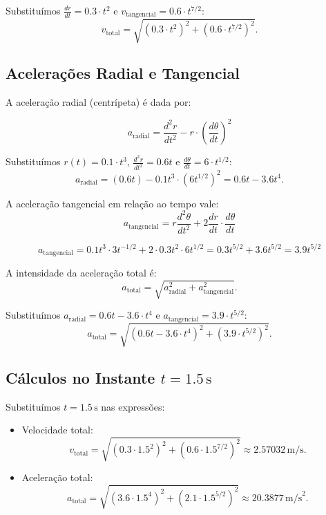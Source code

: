 Substituímos \(\frac{dr}{dt} = 0.3 \cdot t^2\) e \(v_{\text{tangencial}} = 0.6 \cdot t^{7/2}\):
\[
v_{\text{total}} = \sqrt{\left(0.3 \cdot t^2\right)^2 + \left(0.6 \cdot t^{7/2}\right)^2}.
\]

\subsection*{Acelerações Radial e Tangencial}
A aceleração radial (centrípeta) é dada por:

\[
a_{\text{radial}} = \frac{d^2r}{dt^2} - r\cdot \left(\frac{d\theta}{dt}\right)^2
\]


Substituímos \(r(t) = 0.1 \cdot t^3\), \(\frac{d^2r}{dt^2} = 0.6t\) e \(\frac{d\theta}{dt} = 6 \cdot t^{1/2}\):
\[
a_{\text{radial}} = \left(0.6t\right) - 0.1t^3 \cdot (6 t^{1/2})^2 = 0.6t - 3.6t^4.
\]


A aceleração tangencial em relação ao tempo vale:
\[
a_{\text{tangencial}} = r \frac{d^2\theta}{dt^2} + 2\frac{dr}{dt}\cdot \frac{d\theta}{dt}
\]

\[
a_{\text{tangencial}} = 0.1t^3 \cdot 3t^{-1/2} + 2\cdot 0.3t^2\cdot 6t^{1/2} = 0.3t^{5/2} + 3.6 t^{5/2} = 3.9 t^{5/2}
\]

A intensidade da aceleração total é:
\[
a_{\text{total}} = \sqrt{a_{\text{radial}}^2 + a_{\text{tangencial}}^2}.
\]

Substituímos \(a_{\text{radial}} = 0.6t - 3.6 \cdot t^4\) e \(a_{\text{tangencial}} = 3.9 \cdot t^{5/2}\):
\[
a_{\text{total}} = \sqrt{\left(0.6t - 3.6 \cdot t^4\right)^2 + \left(3.9 \cdot t^{5/2}\right)^2}.
\]

\subsection*{Cálculos no Instante \(t = 1.5 \, \text{s}\)}
Substituímos \(t = 1.5 \, \text{s}\) nas expressões:
\begin{itemize}
    \item Velocidade total:
    \[
    v_{\text{total}} = \sqrt{\left(0.3 \cdot 1.5^2\right)^2 + \left(0.6 \cdot 1.5^{7/2}\right)^2} \approx 2.57032 \, \text{m/s}.
    \]
    \item Aceleração total:
    \[
    a_{\text{total}} = \sqrt{\left(3.6 \cdot 1.5^4\right)^2 + \left(2.1 \cdot 1.5^{5/2}\right)^2} \approx 20.3877 \, \text{m/s}^2.
    \]
\end{itemize}